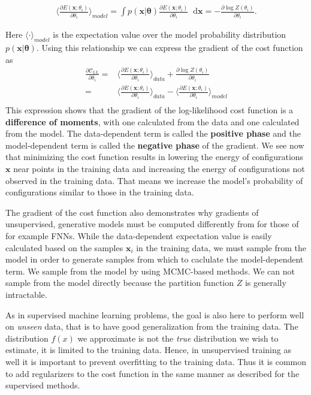 \documentclass[twoside,english]{uiofysmaster}
\newcommand*\dif{\mathop{}\!\mathrm{d}}
\begin{document}
\begin{align}
	\langle \frac{ \partial E(\bm{x}; \theta_i) } { \partial \theta_i} \rangle_{model}
	= \int p(\bm{x}| \bm{\theta}) \frac{ \partial E(\bm{x}; \theta_i) } { \partial \theta_i} \dif \bm{x} 
	= -\frac{\partial \log Z(\theta_i)}{ \partial  \theta_i} .
\end{align}

Here $\langle \cdot \rangle_{model}$ is the expectation value over the model probability distribution $p(\bm{x}| \bm{\theta})$.
Using this relationship we can express the gradient of the cost function as
\begin{align}
	\frac{\partial \mathcal{C}_{LL}}{\partial \theta_i}
	=& \langle \frac{ \partial E(\bm{x}; \theta_i) } { \partial \theta_i} \rangle_{data} + \frac{\partial \log Z(\theta_i)}{ \partial  \theta_i} \\
	=& \langle \frac{ \partial E(\bm{x}; \theta_i) } { \partial \theta_i} \rangle_{data} - \langle \frac{ \partial E(\bm{x}; \theta_i) } { \partial \theta_i} \rangle_{model} \\
\end{align}
This expression shows that the gradient of the log-likelihood cost function is a \textbf{difference of moments}, with one calculated from the data and one calculated from the model. The data-dependent term is called the \textbf{positive phase} and the model-dependent term is called the \textbf{negative phase} of the gradient. We see now that minimizing the cost function results in lowering the energy of configurations $\bm{x}$ near points in the training data and increasing the energy of configurations not observed in the training data. That means we increase the model's probability of configurations similar to those in the training data.

The gradient of the cost function also demonstrates why gradients of unsupervised, generative models must be computed differently from for those of for example FNNs. While the data-dependent expectation value is easily calculated based on the samples $\bm{x}_i$ in the training data, we must sample from the model in order to generate samples from which to caclulate the model-dependent term. We sample from the model by using MCMC-based methods. We can not sample from the model directly because the partition function $Z$ is generally intractable.

As in supervised machine learning problems, the goal is also here to perform well on \textit{unseen} data, that is to have good generalization from the training data. The distribution $f(x)$ we approximate is not the \textit{true} distribution we wish to estimate, it is limited to the training data. Hence, in unsupervised training as well it is important to prevent overfitting to the training data. Thus it is common to add regularizers to the cost function in the same manner as described for the supervised methods.
\end{document}
